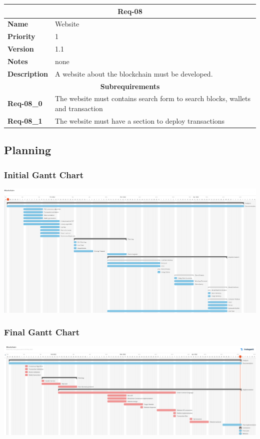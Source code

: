 \documentclass[../documentation.tex]{subfiles}
\begin{document}
\bgroup{}
\def\arraystretch{1.25}
\begin{center}
    \begin{tabular}{ |l|p{9cm}| }
        \hline
        \multicolumn{2}{|c|}{\textbf{Req-08}} \\
        \hline
        \textbf{Name} & Website \\
        \hline
        \textbf{Priority} & 1 \\
        \hline
        \textbf{Version} & 1.1 \\
        \hline
        \textbf{Notes} & none \\
        \hline
        \textbf{Description} & A website about the blockchain must be developed. \\
        \hline
        \multicolumn{2}{|c|}{\textbf{Subrequirements}} \\
        \hline
        \textbf{Req-08\_0} & The website must contains search form to search blocks, wallets and transaction \\
        \hline
        \textbf{Req-08\_1} & The website must have a section to deploy transactions \\
        \hline
    \end{tabular}
\end{center}
\egroup{}

\pagebreak

\subsection{Planning}

\subsubsection{Initial Gantt Chart}

\includegraphics[width=\textwidth]{images/gantt1.png}

\subsubsection{Final Gantt Chart}

\includegraphics[width=\textwidth]{images/gantt2.png}
\end{document}
